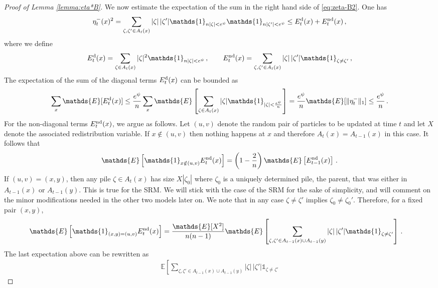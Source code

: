 \documentclass[11pt,reqno]{amsart}
\theoremstyle{remark}
\theoremstyle{definition}
\numberwithin{equation}{section}
\numberwithin{figure}{section}
\newcommand{\E}{\mathds{E}}
\newcommand{\car}{\mathds{1}}
\begin{document}
\begin{proof}[Proof of Lemma \ref{lemma:eta*B}]
		We now estimate  the expectation of the sum in the right hand side of \eqref{eq:zeta-B2}. One has 
		\begin{align}\label{eq:Ed-End}
	\eta_t^-(x)^2=\sum_{\zeta,\zeta'\in A_t(x)}|\zeta|\,|\zeta'|\car_{n|\zeta|<{e^\psi}}\car_{n|\zeta'|<{e^\psi}}\le E_t^{\rm d}(x)+E_t^{\rm nd}(x)\,,
			\end{align}
	where we define 
		\begin{align}
	E_t^{\rm d}(x)=\sum_{\zeta\in A_t(x)}|\zeta|^2\car_{n|\zeta|<{e^\psi}}
	\,,\qquad 
	E_t^{\rm nd}(x) = \sum_{\zeta,\zeta'\in A_t(x)}|\zeta|\,|\zeta'|\car_{\zeta\neq \zeta'}\,,
			\end{align}
		The expectation of the sum of the diagonal terms $E_t^{\rm d}(x)$ can be bounded as
		\begin{equation}\label{eq:zeta-B3}
			\sum_{x}\E[E_t^{\rm d}(x)]\le \frac{e^\psi}{n}\sum_{x}\E\left[ \sum_{\zeta\in A_t(x)}|\zeta|\car_{|\zeta|<\frac{e^\psi}{n}}\right]=\frac{e^\psi}{n}\E[\|\eta_t^-\|_1]\le \frac{e^\psi}{n}\,.
		\end{equation}
			For the non-diagonal terms $E_t^{\rm nd}(x)$, we argue as follows.  Let $(u,v)$ denote the random pair of particles to be updated at time $t$ and let $X$ denote the associated redistribution variable. If $x\notin (u,v)$ then nothing happens at $x$ and therefore $A_t(x) = A_{t-1}(x)$ in this case. It follows that
			 \begin{equation}\label{eq:xnot}
			\E\left[\car_{x\notin (u,v)}E_t^{\rm nd}(x)\right] = \left(1-\frac2n\right)\E\left[E^{\rm nd}_{t-1}(x)\right]\,.
					\end{equation}
					If $(u,v) = (x,y)$, then any pile $\zeta\in A_t(x)$ has size $X|\zeta_0|$ where $\zeta_0$ is a uniquely determined pile, the parent, that was either in $A_{t-1}(x)$ or $A_{t-1}(y)$. This is true for the SRM. 	We will stick with the case of the SRM for the sake of simplicity, and will comment on the minor modifications needed in the other two models later on. We note that in any case $\zeta\neq\zeta'$ implies $\zeta_0\neq\zeta_0'$. Therefore, for a fixed pair $(x,y)$,
			 \begin{align}\label{eq:xin}
			\E\left[\car_{(x,y)= (u,v)}E_t^{\rm nd}(x)\right]& =\frac{\E[X^2]}{n(n-1)}\E\left[\sum_{\zeta,\zeta'\in A_{t-1}(x)\cup A_{t-1}(y)}|\zeta|\,|\zeta'|\car_{\zeta\neq \zeta'}
			\right]\,. 
					\end{align}
					The last expectation above can be rewritten as 
					 \begin{align}\label{eq:xin2}
					 \E\left[\sum_{\zeta,\zeta'\in A_{t-1}(x)\cup A_{t-1}(y)}|\zeta|\,|\zeta'|\car_{\zeta\neq \zeta'}

\end{align}
\end{proof}
\end{document}
